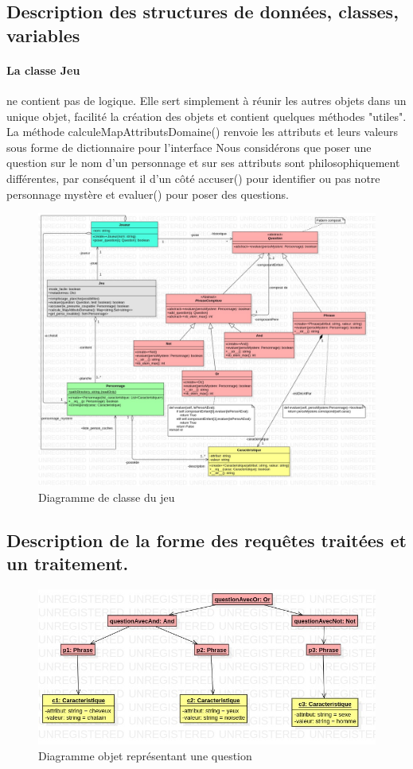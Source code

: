 \documentclass[a4paper]{article}
\begin{document}
 \clearpage
 \subsection*{Description des structures de données, classes, variables}
 \paragraph*{La classe Jeu} ne contient pas de logique. Elle sert simplement à réunir les autres objets dans un unique objet, facilité la création des objets et contient quelques méthodes "utiles".
 La méthode calculeMapAttributsDomaine() renvoie les attributs et leurs valeurs sous forme de dictionnaire pour l'interface
 Nous considérons que poser une question sur le nom d'un personnage et sur ses attributs sont philosophiquement différentes, par conséquent il d'un côté accuser() pour identifier ou pas notre personnage mystère et evaluer() pour poser des questions.
 
 \begin{figure}
   \caption{Diagramme de classe du jeu}
   \centering
   \includegraphics[scale=0.35]{./JeuClassDiagram.jpg}
 \end{figure}
 
 \clearpage
 \subsection*{Description de la forme des requêtes traitées et un traitement.}
 \begin{figure}
   \caption{Diagramme objet représentant une question}
   \centering
   \includegraphics[scale=0.4]{./requetesObject.jpg}
 \end{figure}
\end{document}
